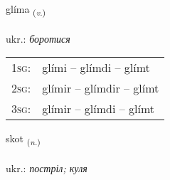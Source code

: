 \documentclass[frontgrid, backgrid]{flacards}\usepackage[]{graphicx}\usepackage[]{xcolor}
\begin{document}
\renewcommand{\flhead}{\vskip5pt \fboxsep=0pt {\small\bfseries\footnotesize Sagnorð | дієслово}}
\renewcommand{\fcfoot}{\vskip5pt \fboxsep=0pt \hspace{2pt}{\small\bfseries\footnotesize 3K}}

\renewcommand{\blhead}{\vskip5pt {\small\bfseries\footnotesize Sagnorð | дієслово }}
\renewcommand{\bcfoot}{\vskip5pt \hspace{2pt}{\small\bfseries\footnotesize 3K}}


{glíma \small{\textsubscript{(\textit{v.})}} \\[1ex] %
\textphonetic{[kliːma]} \\
ukr.: \emph{боротися} \\  [2ex]
\renewcommand*{\arraystretch}{0.8}
\begin{tabular}{p{1cm}l}
\textsc{1sg}: & glími -- glímdi -- glímt \\ 
\textsc{2sg}: & glímir -- glímdir -- glímt \\ 
\textsc{3sg}: & glímir -- glímdi -- glímt \\ 
\end{tabular}
}

\renewcommand{\flhead}{\vskip5pt \fboxsep=0pt {\small\bfseries\footnotesize Nafnorð | іменник}}
\renewcommand{\fcfoot}{\vskip5pt \fboxsep=0pt \hspace{2pt}{\small\bfseries\footnotesize 3K}}

\renewcommand{\blhead}{\vskip5pt {\small\bfseries\footnotesize Nafnorð | іменник }}
\renewcommand{\bcfoot}{\vskip5pt \hspace{2pt}{\small\bfseries\footnotesize 3K}}


{skot \small{\textsubscript{(\textit{n.})}} \\[1ex] %
\textphonetic{[skɔːt]} \\
ukr.: \emph{постріл; куля} \\  [2ex]
\renewcommand*{\arraystretch}{0.8}
}
\end{document}
